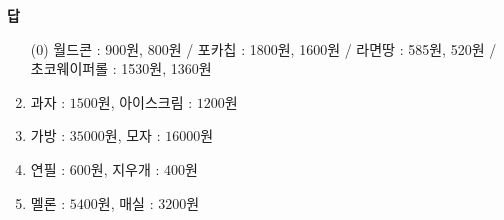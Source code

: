 \documentclass{article}
\begin{document}
\vspace*{\fill}
\noindent\textbf{답}
\begin{enumerate}[label=(\arabic*)]
    \item[(0)] 월드콘 : 900원, 800원 / 포카칩 : 1800원, 1600원 / 라면땅 : 585원, 520원 / 초코웨이퍼롤 : 1530원, 1360원
    \item 과자 : \(1500\)원, 아이스크림 : \(1200\)원
    \item 가방 : \(35000\)원, 모자 : \(16000\)원
    \item 연필 : \(600\)원, 지우개 : \(400\)원
    \item 멜론 : \(5400\)원, 매실 : \(3200\)원
\end{enumerate}


\newpage
\section{}
\end{document}
